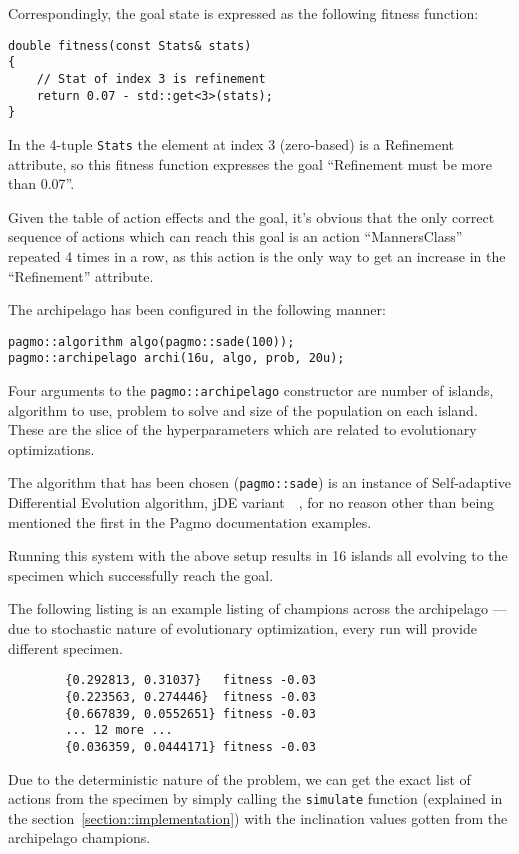 \documentclass[12pt, a4paper]{report}
\begin{document}
	Correspondingly, the goal state is expressed as the following fitness function:
	
	\begin{lstlisting}
double fitness(const Stats& stats)
{
	// Stat of index 3 is refinement
	return 0.07 - std::get<3>(stats);
}
	\end{lstlisting}
	
	In the 4-tuple \texttt{Stats} the element at index 3 (zero-based) is a Refinement attribute, so this fitness function expresses the goal ``Refinement must be more than 0.07''.
	
	Given the table of action effects and the goal, it's obvious that the only correct sequence of actions which can reach this goal is an action ``MannersClass'' repeated 4 times in a row, as this action is the only way to get an increase in the ``Refinement'' attribute.
	
	The archipelago has been configured in the following manner:
	
	\begin{lstlisting}
pagmo::algorithm algo(pagmo::sade(100));
pagmo::archipelago archi(16u, algo, prob, 20u);
	\end{lstlisting}

	Four arguments to the \texttt{pagmo::archipelago} constructor are number of islands, algorithm to use, problem to solve and size of the population on each island.
	These are the slice of the hyperparameters which are related to evolutionary optimizations.
	
	The algorithm that has been chosen (\texttt{pagmo::sade}) is an instance of Self-adaptive Differential Evolution algorithm, jDE variant~\cite{sade_jDE}~\cite{sade_iDE}, for no reason other than being mentioned the first in the Pagmo documentation examples.

	Running this system with the above setup results in 16 islands all evolving to the specimen which successfully reach the goal.
	
	The following listing is an example listing of champions across the archipelago --- due to stochastic nature of evolutionary optimization, every run will provide different specimen.
	
	\begin{verbatim}
		{0.292813, 0.31037}   fitness -0.03
		{0.223563, 0.274446}  fitness -0.03
		{0.667839, 0.0552651} fitness -0.03
		... 12 more ...
		{0.036359, 0.0444171} fitness -0.03
	\end{verbatim}
	
	Due to the deterministic nature of the problem, we can get the exact list of actions from the specimen by simply calling the \texttt{simulate} function (explained in the section~\ref{section::implementation}) with the inclination values gotten from the archipelago champions.
	
\end{document}
